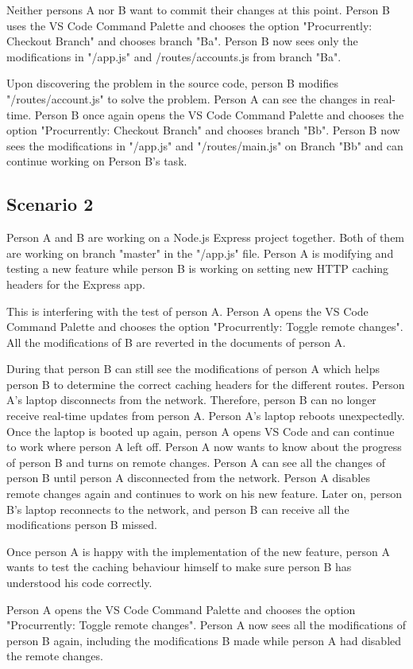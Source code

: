 Neither persons A nor B want to commit their changes at this point.
Person B uses the VS Code Command Palette and chooses the option "Procurrently: Checkout Branch" and chooses branch "Ba".
Person B now sees only the modifications in "/app.js" and /routes/accounts.js from branch "Ba".

Upon discovering the problem in the source code, person B modifies "/routes/account.js" to solve the problem.
Person A can see the changes in real-time.
Person B once again opens the VS Code Command Palette and chooses the option "Procurrently: Checkout Branch" and chooses branch "Bb".
Person B now sees the modifications in "/app.js" and "/routes/main.js" on Branch "Bb" and can continue working on Person B's task.

\subsection{Scenario 2}
Person A and B are working on a Node.js Express project together. Both of them are working on branch "master" in the "/app.js" file.
Person A is modifying and testing a new feature while person B is working on setting new HTTP caching headers for the Express app.

This is interfering with the test of person A. Person A opens the VS Code Command Palette and chooses the option "Procurrently: Toggle remote changes".
All the modifications of B are reverted in the documents of person A.

During that person B can still see the modifications of person A which helps person B to determine the correct caching headers for the different routes.
Person A's laptop disconnects from the network. Therefore, person B can no longer receive real-time updates from person A.
Person A's laptop reboots unexpectedly. Once the laptop is booted up again, person A opens VS Code and can continue to work where person A left off.
Person A now wants to know about the progress of person B and turns on remote changes. Person A can see all the changes of person B until person A disconnected from the network. Person A disables remote changes again and continues to work on his new feature.
Later on, person B's laptop reconnects to the network, and person B can receive all the modifications person B missed.

Once person A is happy with the implementation of the new feature, person A wants to test the caching behaviour himself to make sure person B has understood his code correctly.

Person A opens the VS Code Command Palette and chooses the option "Procurrently: Toggle remote changes".
Person A now sees all the modifications of person B again, including the modifications B made while person A had disabled the remote changes.